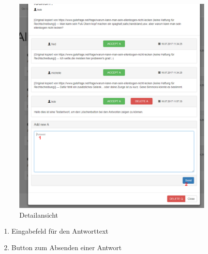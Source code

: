 \documentclass[a4paper]{report}
\begin{document}
\begin{figure}[h!]
	\centering
	\includegraphics[width=0.9\textwidth]{./Bilder/FrageMitAntwortenUndAntwortfeld.PNG}
	\caption{Detailansicht}
	\label{fig:Detailansicht2}
\end{figure}
\centering\begin{enumerate}	 
	\item Eingabefeld für den Antworttext
	\item Button zum Absenden einer Antwort
\end{enumerate}
\newpage
\end{document}
